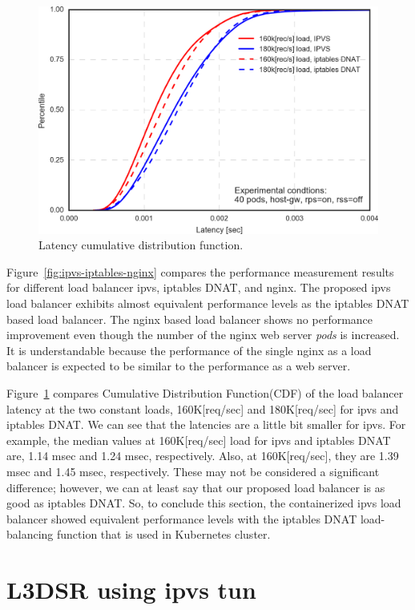 \begin{figure}[htb]
  \centering
  \includegraphics[width=0.8\columnwidth]{Figs/latency_cdf_rps_40pods}
  \caption{Latency cumulative distribution function.}
  \label{fig:latency_cdf_rps_40pods}
\end{figure}

Figure~\ref{fig:ipvs-iptables-nginx} compares the performance measurement results for different load balancer ipvs, iptables DNAT, and nginx.
The proposed ipvs load balancer exhibits almost equivalent performance levels as the iptables DNAT based load balancer. 
The nginx based load balancer shows no performance improvement even though the number of the nginx web server {\em pods} is increased.
It is understandable because the performance of the single nginx as a load balancer is expected to be similar to the performance as a web server.

Figure~\ref{fig:latency_cdf_rps_40pods} compares Cumulative Distribution Function(CDF) of the load balancer latency at the two constant loads, 160K[req/sec] and 180K[req/sec] for ipvs and iptables DNAT.
We can see that the latencies are a little bit smaller for ipvs.
For example, the median values at 160K[req/sec] load for ipvs and iptables DNAT are, 1.14 msec and 1.24 msec, respectively.
Also, at 160K[req/sec], they are 1.39 msec and 1.45 msec, respectively.
These may not be considered a significant difference; however, we can at least say that our proposed load balancer is as good as iptables DNAT.
So, to conclude this section, the containerized ipvs load balancer showed equivalent performance levels with the iptables DNAT load-balancing function that is used in Kubernetes cluster.

\FloatBarrier
\section{L3DSR using ipvs tun}

